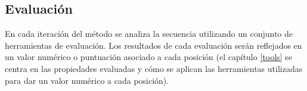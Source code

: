 







\subsection{Evaluación}



En cada iteración del método se analiza la secuencia utilizando un conjunto de herramientas de evaluación.
Los resultados de cada evaluación serán reflejados en un valor numérico o puntuación asociado a cada posición
(el capítulo \ref{tools} se centra en las propiedades evaluadas y cómo se aplican las herramientas utilizadas para dar un valor numérico a cada posición). 


